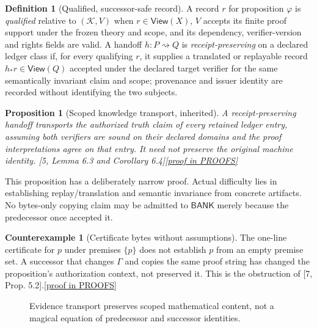 \documentclass[11pt,letterpaper]{article}
\newtheorem{proposition}[theorem]{Proposition}
\theoremstyle{definition}
\newtheorem{definition}[theorem]{Definition}
\newtheorem{counterexample}[theorem]{Counterexample}
\theoremstyle{remark}
\newcommand{\K}{\mathcal K}
\newcommand{\View}{\mathsf{View}}
\newcommand{\Bank}{\mathsf{BANK}}
\newcommand{\prooflink}[1]{\hfill\hyperlink{proof:#1}{\footnotesize[proof in PROOFS]}}
\newcommand{\src}[1]{\textup{[#1]}}
\begin{document}
\begin{definition}[Qualified, successor-safe record]\label{def:record}
A record $r$ for proposition $\varphi$ is \emph{qualified} relative to $(\K,V)$ when $r\in\View(X)$, $V$ accepts its finite proof support under the frozen theory and scope, and its dependency, verifier-version and rights fields are valid. A handoff $h:P\rightsquigarrow Q$ is \emph{receipt-preserving} on a declared ledger class if, for every qualifying $r$, it supplies a translated or replayable record $h_*r\in\View(Q)$ accepted under the declared target verifier for the same semantically invariant claim and scope; provenance and issuer identity are recorded without identifying the two subjects.
\end{definition}

\begin{proposition}[Scoped knowledge transport, inherited]\label{prop:transport}\hypertarget{claim:transport}{}
A receipt-preserving handoff transports the authorized truth claim of every retained ledger entry, assuming both verifiers are sound on their declared domains and the proof interpretations agree on that entry. It need not preserve the original machine identity. \src{5, Lemma 6.3 and Corollary 6.4}\prooflink{transport}
\end{proposition}

This proposition has a deliberately narrow proof. Actual difficulty lies in establishing replay/translation and semantic invariance from concrete artifacts. No bytes-only copying claim may be admitted to $\Bank$ merely because the predecessor once accepted it.

\begin{counterexample}[Certificate bytes without assumptions]\label{cex:scope}\hypertarget{claim:scope}{}
The one-line certificate for $p$ under premises $\{p\}$ does not establish $p$ from an empty premise set. A successor that changes $\Gamma$ and copies the same proof string has changed the proposition's authorization context, not preserved it. This is the obstruction of \src{7, Prop. 5.2}.\prooflink{scope}
\end{counterexample}

\begin{figure}[htbp]\centering
{}
\caption{Evidence transport preserves scoped mathematical content, not a magical equation of predecessor and successor identities.}\end{figure}
\end{document}
